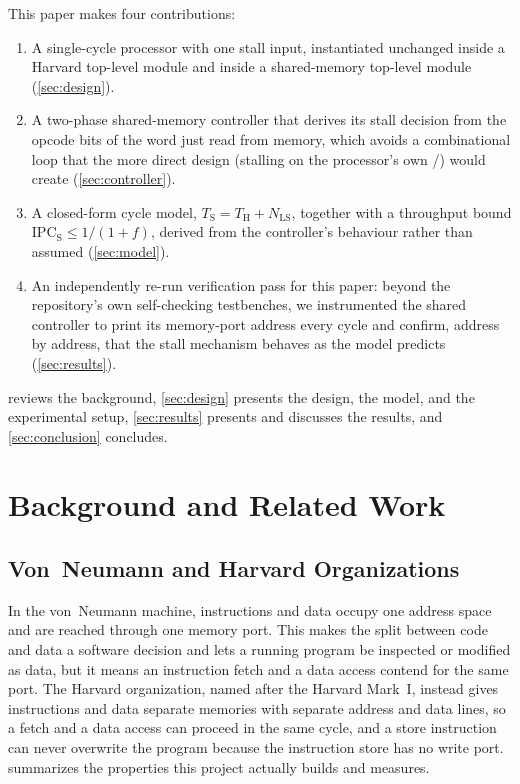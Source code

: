 \documentclass[conference]{IEEEtran}
\newcommand{\NLS}{N_{\mathrm{LS}}}
\newcommand{\Tharv}{T_{\mathrm{H}}}
\newcommand{\Tshr}{T_{\mathrm{S}}}
\newcommand{\sig}[1]{\texttt{\detokenize{#1}}}
\begin{document}
This paper makes four contributions:
\begin{enumerate}
  \item A single-cycle processor with one stall input, instantiated unchanged inside a Harvard
        top-level module and inside a shared-memory top-level module
        (\cref{sec:design}).
  \item A two-phase shared-memory controller that derives its stall decision from the opcode bits
        of the word just read from memory, which avoids a combinational loop that the more direct
        design (stalling on the processor's own \sig{d_re}/\sig{d_we}) would create
        (\cref{sec:controller}).
  \item A closed-form cycle model, $\Tshr = \Tharv + \NLS$, together with a throughput bound
        $\mathrm{IPC}_{\mathrm{S}} \le 1/(1+f)$, derived from the controller's behaviour rather
        than assumed (\cref{sec:model}).
  \item An independently re-run verification pass for this paper: beyond the repository's own
        self-checking testbenches, we instrumented the shared controller to print its memory-port
        address every cycle and confirm, address by address, that the stall mechanism behaves as
        the model predicts (\cref{sec:results}).
\end{enumerate}

 reviews the background, \cref{sec:design} presents the design, the model, and
the experimental setup, \cref{sec:results} presents and discusses the results, and
\cref{sec:conclusion} concludes.

\section{Background and Related Work}
\label{sec:background}

\subsection{Von~Neumann and Harvard Organizations}
In the von~Neumann machine, instructions and data occupy one address space and are reached through
one memory port. This makes the split between code and data a software decision and lets a running
program be inspected or modified as data, but it means an instruction fetch and a data access
contend for the same port. The Harvard organization, named after the Harvard Mark~I, instead gives
instructions and data separate memories with separate address and data lines, so a fetch and a data
access can proceed in the same cycle, and a store instruction can never overwrite the program
because the instruction store has no write port.  summarizes the properties this
project actually builds and measures.
\end{document}

